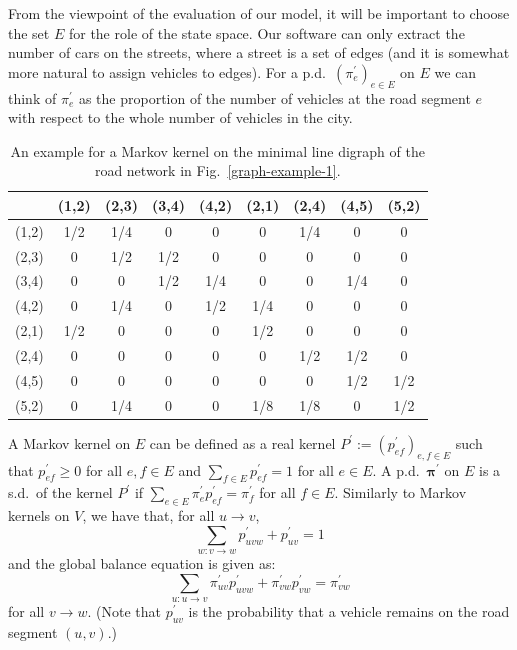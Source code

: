 \documentclass[b5paper,12pt]{report}
\theoremstyle{definition}
\newcommand{\bpi}{\boldsymbol{\pi}}
\begin{document}
From the viewpoint of the evaluation of our model, it will be important to choose the set $E$ for the role of the state space. Our software can only extract the number of cars on the streets, where a street is a set of edges (and it is somewhat more natural to assign vehicles to edges). For a p.d.~$(\pi^\prime_e)_{e\in E}$ on $E$ we can think of $\pi^\prime_e$ as the proportion of the number of vehicles at the road segment $e$ with respect to the whole number of vehicles in the city.

\begin{table}[t!]
\center
\caption{An example for a Markov kernel on the minimal line digraph of the road network in Fig.~\ref{graph-example-1}.}
\begin{tabular}{c|cccccccc}
&(1,2)&(2,3)&(3,4)&(4,2)&(2,1) &(2,4)&(4,5)&(5,2)\\ \hline 
(1,2)&1/2&1/4&0&0&0 &1/4&0&0\\ (2,3)&0&1/2&1/2&0&0 &0&0&0\\                 (3,4)&0&0&1/2&1/4&0 &0&1/4&0\\              (4,2)&0&1/4&0&1/2&1/4 &0&0&0\\ (2,1)&1/2&0&0&0&1/2 &0&0&0 \\                (2,4)&0&0&0&0&0&1/2&1/2&0\\                 (4,5)&0&0&0&0&0&0&1/2&1/2 \\(5,2)&0&1/4&0&0&1/8&1/8&0&1/2
\end{tabular}
\label{markov-kernel-r}
\end{table}

A Markov kernel on $E$ can be defined as a real kernel $P^\prime:=(p^\prime_{ef})_{e,f\in E}$ such that $p^\prime_{ef}\ge 0$ for all $e,f\in E$ and $\sum_{f\in E}p^\prime_{ef} = 1$ for all $e\in E$. A p.d.~$\bpi^\prime$ on $E$ is a s.d.~of the kernel $P^\prime$ if $\sum_{e\in E} \pi^\prime_e p^\prime_{ef} = \pi^\prime_f$ for all $f\in E$. Similarly to Markov kernels on $V$, we have that, for all $u\rightarrow v$,
\begin{equation}\label{Rsum}
\sum_{w:v\rightarrow w} p^\prime_{uvw} + p^\prime_{uv} =1
\end{equation}
and the global balance equation is given as:
\begin{equation}\label{rho_eq}
            \sum_{u:u\rightarrow v} \pi^\prime_{uv} p^\prime_{uvw} + \pi^\prime_{vw} p^\prime_{vw} = \pi^\prime_{vw}
\end{equation}
for all $v\rightarrow w$. (Note that $p^\prime_{uv}$ is the probability that a vehicle remains on the road segment $(u,v)$.)
\end{document}
